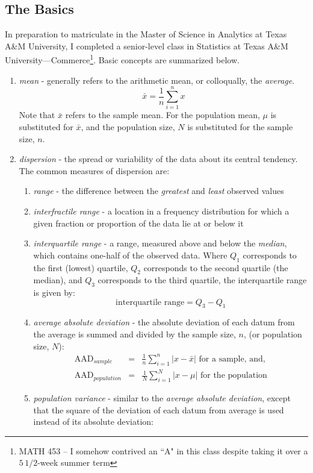 \documentclass[12pt]{article}
\begin{document}
\subsection{The Basics}
In preparation to matriculate in the Master of Science in Analytics at Texas A\&M University, I completed a senior-level class in Statistics at Texas A\&M University---Commerce\footnote{MATH 453 -- I somehow contrived an ``A" in this class despite taking it over a $5\,1/2$-week summer term}. 
Basic concepts are summarized below.
\begin{enumerate}
\item \textit{mean} - generally refers to the arithmetic mean, or colloqually, the \textit{average}. 
\begin{equation}
\bar{x}=\frac{1}{n} \sum_{i=1}^{n} x
\end{equation}
Note that \(\bar{x}\) refers to the sample mean. For the population mean, \(\mu\) is substituted for \(\bar{x}\), and the population size, $N$ is substituted for the sample size, $n$.
\item \textit{dispersion} - the spread or variability of the data about its central tendency. The common measures of dispersion are:
\begin{enumerate}
\item \textit{range} - the difference between the \textit{greatest} and \textit{least} observed values
\item \textit{interfractile range} - a location in a frequency distribution for which a given fraction or proportion of the data lie at or below it
\item \textit{interquartile range} - a range, measured above and below the \textit{median}, which contains one-half of the observed data. Where \(Q_1\) corresponds to the first (lowest) quartile, \(Q_2\) corresponds to the second quartile (the median), and \(Q_3\) corresponds to the third quartile, the interquartile range is given by:
$$\textrm{interquartile range} = Q_3 - Q_1$$
\item \textit{average absolute deviation} - the absolute deviation of each datum from the average is summed and divided by the sample size, $n$, (or population size, $N$):
\begin{eqnarray}
\textrm{AAD}_{sample} & = & \frac{1}{n} \sum_{i=1}^{n} |x - \bar{x}| \textrm{ for a sample, and,} \\
\textrm{AAD}_{population} & = & \frac{1}{N} \sum_{i=1}^{N} |x - \mu| \textrm{ for the population}
\end{eqnarray}
\item \textit{population variance} - similar to the \textit{average absolute deviation}, except that the square of the deviation of each datum from average is used instead of its absolute deviation:

\end{enumerate}
\end{enumerate}
\end{document}
